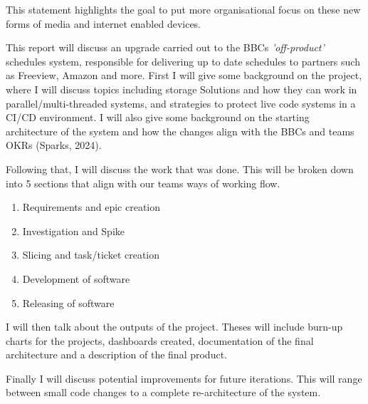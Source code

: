   This statement highlights the goal to put more organisational focus on these new forms of media and internet enabled devices. 
  
  This report will discuss an upgrade carried out to the BBCs \textit{'off-product'} schedules system, responsible for delivering up to date schedules to
  partners such as Freeview, Amazon and more. First I will give some background on the project, where I will discuss topics including storage Solutions
  and how they can work in parallel/multi-threaded systems, and strategies to protect live code systems in a CI/CD environment. I will also give some 
  background on the starting architecture of the system and how the changes align with the BBCs and teams OKRs (Sparks, 2024).
  
  Following that, I will discuss the work that was done. This will be broken down into 5 sections that align with our teams ways of working flow.
  \begin{enumerate}
    \item Requirements and epic creation
    \item Investigation and Spike
    \item Slicing and task/ticket creation
    \item Development of software
    \item Releasing of software
  \end{enumerate}

  I will then talk about the outputs of the project. Theses will include burn-up charts for the projects, dashboards created, documentation of the final 
  architecture and a description of the final product.

  Finally I will discuss potential improvements for future iterations. This will range between small code changes to a complete re-architecture of the system.
\newpage
